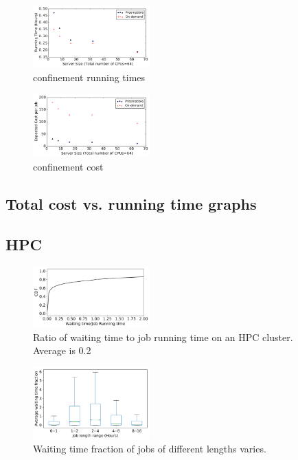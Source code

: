 \begin{figure}[h]
  \centering
  \includegraphics[width=0.4\textwidth]{../graphs/confin_64_time.pdf}
  \caption{confinement running times}
  \label{fig:confin-64-times}
\end{figure}


\begin{figure}[h]
  \centering
  \includegraphics[width=0.4\textwidth]{../graphs/confin_64_cost.pdf}
  \caption{confinement cost}
  \label{fig:confin-64-cost}
\end{figure}



\subsection{Total cost vs. running time graphs}

\subsection{HPC}

\begin{figure}
  \includegraphics[width=0.4\textwidth]{../data/waiting_all.pdf}
  \caption{Ratio of waiting time to job running time on an HPC cluster. Average is 0.2}
  \label{fig:hpc-wait-cdf}
\end{figure}



\begin{figure}
  \includegraphics[width=0.4\textwidth]{../graphs/waiting_time_buckets.pdf}
  \caption{Waiting time fraction of jobs of different lengths varies.}
  \label{fig:hpc-wait-buckets}  
\end{figure}

